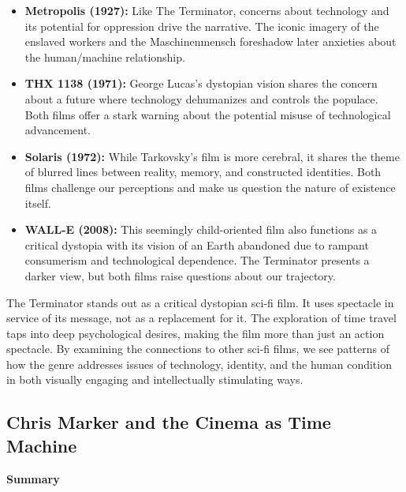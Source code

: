 \documentclass[11pt,fleqn]{book} %
\begin{document}
\begin{itemize}
\item \textbf{Metropolis (1927):}  Like The Terminator, concerns about technology and its potential for oppression drive the narrative.  The iconic imagery of the enslaved workers and the Maschinenmensch foreshadow later anxieties about the human/machine relationship.  

\item \textbf{THX 1138 (1971):}  George Lucas's dystopian vision shares the concern about a future where technology dehumanizes and controls the populace.  Both films offer a stark warning about the potential misuse of technological advancement.

\item \textbf{Solaris (1972):}  While Tarkovsky's film is more cerebral, it shares the theme of blurred lines between reality, memory, and constructed identities.  Both films challenge our perceptions and make us question the nature of existence itself.

\item \textbf{WALL-E (2008):}  This seemingly child-oriented film also functions as a critical dystopia with its vision of an Earth abandoned due to rampant consumerism and technological dependence.  The Terminator presents a darker view, but both films raise questions about our trajectory.
\end{itemize}

\vspace{5pt}

The Terminator stands out as a critical dystopian sci-fi film.  It uses spectacle in service of its message, not as a replacement for it.  The exploration of time travel taps into deep psychological desires, making the film more than just an action spectacle.  By examining the connections to other sci-fi films, we see patterns of how the genre addresses issues of technology, identity, and the human condition in both visually engaging and intellectually stimulating ways. 




\subsection{Chris Marker and the Cinema as Time Machine}
\textbf{Summary}
\end{document}
